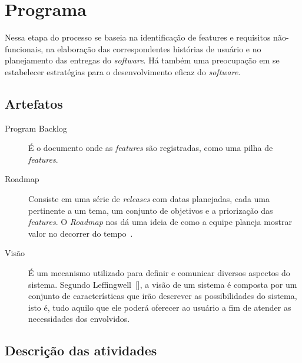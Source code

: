 \section{Programa}
Nessa etapa do processo se baseia na identificação de features e requisitos não-funcionais, na elaboração das correspondentes histórias de usuário e no planejamento das entregas do \textit{software}. Há também uma preocupação em se estabelecer estratégias para o desenvolvimento eficaz do \textit{software}.

\subsection{Artefatos}
\begin{description}
\item[Program Backlog] É o documento onde as \textit{features} são registradas, como uma pilha de \textit{features}.
\item[Roadmap] Consiste em uma série de \textit{releases} com datas planejadas, cada uma pertinente a um tema, um conjunto de objetivos e a priorização das \textit{features}. O \textit{Roadmap} nos dá uma ideia de como a equipe planeja mostrar valor no decorrer do tempo~\cite{leffingwell}.
\item[Visão] É um mecanismo utilizado para definir e comunicar diversos aspectos do sistema. Segundo Leffingwell~[\citeyear{leffingwell}], a visão de um sistema é composta por um conjunto de características que irão descrever as possibilidades do sistema, isto é, tudo aquilo que ele poderá oferecer ao usuário a fim de atender as necessidades dos envolvidos.
\end{description}

\clearpage

\subsection{Descrição das atividades}

